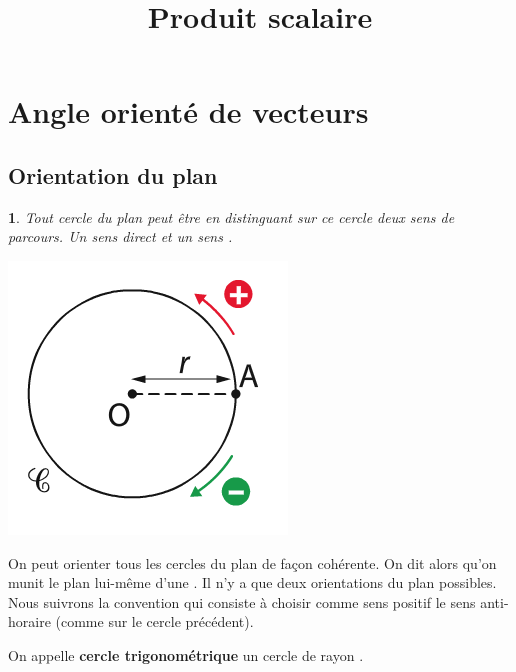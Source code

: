 \documentclass{beamer}
\date{}
\title{Produit scalaire}
\newtheorem{proposition}[theorem]{\translate{Proposition}}
\theoremstyle{plain}
\begin{document}
  
  \begin{frame}
    
    \titlepage
    
  \end{frame}
  
   \section{Angle orienté de vecteurs}
  
  \subsection{Orientation du plan}
 
  \begin{frame}
  

  
  \begin{proposition}
   Tout cercle du plan peut être  en distinguant sur ce cercle deux sens de parcours. Un sens direct
   et un sens .
 
 \begin{center}
   \includegraphics[scale=0.5]{../Images/orientation.png}
 \end{center}
    
  
  \end{proposition}
  
  \end{frame}
  
  \begin{frame}
     On peut orienter tous les cercles du plan de façon cohérente. On dit alors qu'on munit le plan lui-même
    d'une . Il n'y a que deux orientations du plan possibles. Nous suivrons la convention
    qui consiste à choisir comme sens positif le sens anti-horaire (comme sur le cercle précédent).
    
    On appelle  \textbf{cercle trigonométrique} un cercle  de rayon . 
  \end{frame}
\end{document}
